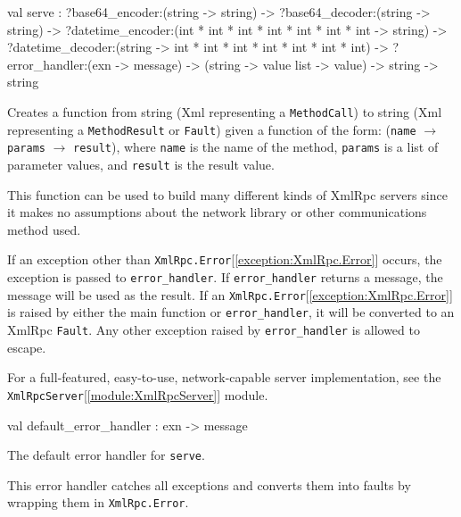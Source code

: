 \documentclass[11pt]{article}
\begin{document}
\label{val:XmlRpc.serve}\begin{ocamldoccode}
val serve :
  ?base64_encoder:(string -> string) ->
  ?base64_decoder:(string -> string) ->
  ?datetime_encoder:(int * int * int * int * int * int * int -> string) ->
  ?datetime_decoder:(string -> int * int * int * int * int * int * int) ->
  ?error_handler:(exn -> message) ->
  (string -> value list -> value) -> string -> string
\end{ocamldoccode}
\begin{ocamldocdescription}
Creates a function from string (Xml representing a {\tt{MethodCall}}) to
    string (Xml representing a {\tt{MethodResult}} or {\tt{Fault}}) given a function
    of the form: ({\tt{name}} $\rightarrow$ {\tt{params}} $\rightarrow$ {\tt{result}}), where {\tt{name}} is the
    name of the method, {\tt{params}} is a list of parameter values, and
    {\tt{result}} is the result value.


    This function can be used to build many different kinds of XmlRpc
    servers since it makes no assumptions about the network library
    or other communications method used.


    If an exception other than {\tt{XmlRpc.Error}}[\ref{exception:XmlRpc.Error}] occurs, the exception is
    passed to {\tt{error\_handler}}. If {\tt{error\_handler}} returns a message,
    the message will be used as the result. If an {\tt{XmlRpc.Error}}[\ref{exception:XmlRpc.Error}] is
    raised by either the main function or {\tt{error\_handler}}, it will be
    converted to an XmlRpc {\tt{Fault}}. Any other exception raised by
    {\tt{error\_handler}} is allowed to escape.


    For a full-featured, easy-to-use, network-capable server implementation,
    see the {\tt{XmlRpcServer}}[\ref{module:XmlRpcServer}] module.


\end{ocamldocdescription}




\label{val:XmlRpc.default-underscoreerror-underscorehandler}\begin{ocamldoccode}
val default_error_handler : exn -> message
\end{ocamldoccode}
\begin{ocamldocdescription}
The default error handler for {\tt{serve}}.


    This error handler catches all exceptions and converts them into
    faults by wrapping them in {\tt{XmlRpc.Error}}.


\end{ocamldocdescription}
\end{document}

